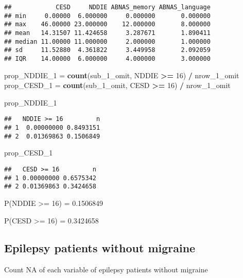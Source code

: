 \documentclass[]{article}
\newenvironment{Shaded}{\begin{snugshade}}{\end{snugshade}}
\newcommand{\KeywordTok}[1]{\textcolor[rgb]{0.13,0.29,0.53}{\textbf{#1}}}
\newcommand{\DecValTok}[1]{\textcolor[rgb]{0.00,0.00,0.81}{#1}}
\newcommand{\StringTok}[1]{\textcolor[rgb]{0.31,0.60,0.02}{#1}}
\newcommand{\OperatorTok}[1]{\textcolor[rgb]{0.81,0.36,0.00}{\textbf{#1}}}
\newcommand{\NormalTok}[1]{#1}
\begin{document}
\begin{verbatim}
##            CESD     NDDIE ABNAS_memory ABNAS_language
## min     0.00000  6.000000     0.000000       0.000000
## max    46.00000 23.000000    12.000000       8.000000
## mean   14.31507 11.424658     3.287671       1.890411
## median 11.00000 11.000000     2.000000       1.000000
## sd     11.52880  4.361822     3.449958       2.092059
## IQR    14.00000  6.000000     4.000000       3.000000
\end{verbatim}

\begin{Shaded}
\begin{Highlighting}[]
\NormalTok{prop_NDDIE_}\DecValTok{1}\NormalTok{ =}\StringTok{ }\KeywordTok{count}\NormalTok{(sub_1_omit, NDDIE }\OperatorTok{>=}\StringTok{ }\DecValTok{16}\NormalTok{) }\OperatorTok{/}\StringTok{ }\NormalTok{nrow_1_omit}
\NormalTok{prop_CESD_}\DecValTok{1}\NormalTok{ =}\StringTok{ }\KeywordTok{count}\NormalTok{(sub_1_omit, CESD }\OperatorTok{>=}\StringTok{ }\DecValTok{16}\NormalTok{) }\OperatorTok{/}\StringTok{ }\NormalTok{nrow_1_omit}

\NormalTok{prop_NDDIE_}\DecValTok{1}
\end{Highlighting}
\end{Shaded}

\begin{verbatim}
##   NDDIE >= 16         n
## 1  0.00000000 0.8493151
## 2  0.01369863 0.1506849
\end{verbatim}

\begin{Shaded}
\begin{Highlighting}[]
\NormalTok{prop_CESD_}\DecValTok{1}
\end{Highlighting}
\end{Shaded}

\begin{verbatim}
##   CESD >= 16         n
## 1 0.00000000 0.6575342
## 2 0.01369863 0.3424658
\end{verbatim}

P(NDDIE \textgreater{}= 16) = 0.1506849

P(CESD \textgreater{}= 16) = 0.3424658

\subsection{Epilepsy patients without
migraine}\label{epilepsy-patients-without-migraine}

Count NA of each variable of epilepsy patients without migraine
\end{document}
